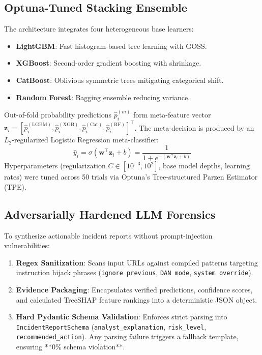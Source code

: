 \documentclass[conference]{IEEEtran}
\begin{document}
\subsection{Optuna-Tuned Stacking Ensemble}
The architecture integrates four heterogeneous base learners:
\begin{itemize}
    \item \textbf{LightGBM}: Fast histogram-based tree learning with GOSS.
    \item \textbf{XGBoost}: Second-order gradient boosting with shrinkage.
    \item \textbf{CatBoost}: Oblivious symmetric trees mitigating categorical shift.
    \item \textbf{Random Forest}: Bagging ensemble reducing variance.
\end{itemize}
Out-of-fold probability predictions $\hat{p}_i^{(m)}$ form meta-feature vector $\mathbf{z}_i = [\hat{p}_i^{(\text{LGBM})}, \hat{p}_i^{(\text{XGB})}, \hat{p}_i^{(\text{Cat})}, \hat{p}_i^{(\text{RF})}]^\top$. The meta-decision is produced by an $L_2$-regularized Logistic Regression meta-classifier:
\begin{equation}
\hat{y}_i = \sigma(\mathbf{w}^\top \mathbf{z}_i + b) = \frac{1}{1 + e^{-(\mathbf{w}^\top \mathbf{z}_i + b)}}
\end{equation}
Hyperparameters (regularization $C \in [10^{-3}, 10^2]$, base model depths, learning rates) were tuned across 50 trials via Optuna's Tree-structured Parzen Estimator (TPE).

\subsection{Adversarially Hardened LLM Forensics}
To synthesize actionable incident reports without prompt-injection vulnerabilities:
\begin{enumerate}
    \item \textbf{Regex Sanitization}: Scans input URLs against compiled patterns targeting instruction hijack phrases (\texttt{ignore previous}, \texttt{DAN mode}, \texttt{system override}).
    \item \textbf{Evidence Packaging}: Encapsulates verified predictions, confidence scores, and calculated TreeSHAP feature rankings into a deterministic JSON object.
    \item \textbf{Hard Pydantic Schema Validation}: Enforces strict parsing into \texttt{IncidentReportSchema} (\texttt{analyst\_explanation}, \texttt{risk\_level}, \texttt{recommended\_action}). Any parsing failure triggers a fallback template, ensuring **0\% schema violation**.
\end{enumerate}
\end{document}
